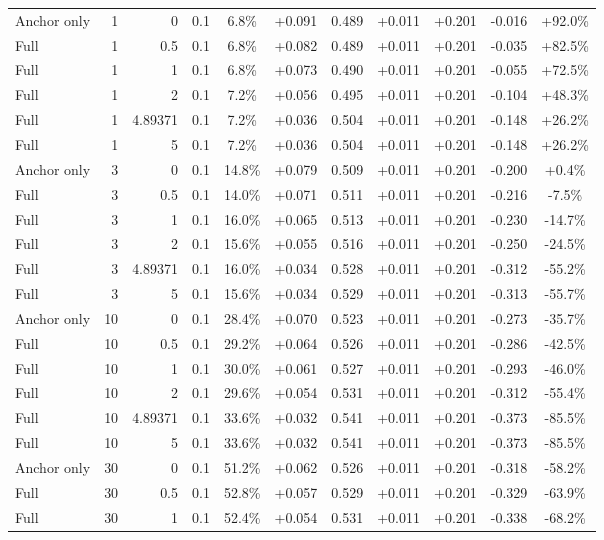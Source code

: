 \begin{table}[htbp]
\begin{tabular}{lrrrccccccc}
Anchor only & 1 & 0 & 0.1 & 6.8\% & +0.091 & 0.489 & +0.011 & +0.201 & -0.016 & +92.0\% \\
Full & 1 & 0.5 & 0.1 & 6.8\% & +0.082 & 0.489 & +0.011 & +0.201 & -0.035 & +82.5\% \\
Full & 1 & 1 & 0.1 & 6.8\% & +0.073 & 0.490 & +0.011 & +0.201 & -0.055 & +72.5\% \\
Full & 1 & 2 & 0.1 & 7.2\% & +0.056 & 0.495 & +0.011 & +0.201 & -0.104 & +48.3\% \\
Full & 1 & 4.89371 & 0.1 & 7.2\% & +0.036 & 0.504 & +0.011 & +0.201 & -0.148 & +26.2\% \\
Full & 1 & 5 & 0.1 & 7.2\% & +0.036 & 0.504 & +0.011 & +0.201 & -0.148 & +26.2\% \\
Anchor only & 3 & 0 & 0.1 & 14.8\% & +0.079 & 0.509 & +0.011 & +0.201 & -0.200 & +0.4\% \\
Full & 3 & 0.5 & 0.1 & 14.0\% & +0.071 & 0.511 & +0.011 & +0.201 & -0.216 & -7.5\% \\
Full & 3 & 1 & 0.1 & 16.0\% & +0.065 & 0.513 & +0.011 & +0.201 & -0.230 & -14.7\% \\
Full & 3 & 2 & 0.1 & 15.6\% & +0.055 & 0.516 & +0.011 & +0.201 & -0.250 & -24.5\% \\
Full & 3 & 4.89371 & 0.1 & 16.0\% & +0.034 & 0.528 & +0.011 & +0.201 & -0.312 & -55.2\% \\
Full & 3 & 5 & 0.1 & 15.6\% & +0.034 & 0.529 & +0.011 & +0.201 & -0.313 & -55.7\% \\
Anchor only & 10 & 0 & 0.1 & 28.4\% & +0.070 & 0.523 & +0.011 & +0.201 & -0.273 & -35.7\% \\
Full & 10 & 0.5 & 0.1 & 29.2\% & +0.064 & 0.526 & +0.011 & +0.201 & -0.286 & -42.5\% \\
Full & 10 & 1 & 0.1 & 30.0\% & +0.061 & 0.527 & +0.011 & +0.201 & -0.293 & -46.0\% \\
Full & 10 & 2 & 0.1 & 29.6\% & +0.054 & 0.531 & +0.011 & +0.201 & -0.312 & -55.4\% \\
Full & 10 & 4.89371 & 0.1 & 33.6\% & +0.032 & 0.541 & +0.011 & +0.201 & -0.373 & -85.5\% \\
Full & 10 & 5 & 0.1 & 33.6\% & +0.032 & 0.541 & +0.011 & +0.201 & -0.373 & -85.5\% \\
Anchor only & 30 & 0 & 0.1 & 51.2\% & +0.062 & 0.526 & +0.011 & +0.201 & -0.318 & -58.2\% \\
Full & 30 & 0.5 & 0.1 & 52.8\% & +0.057 & 0.529 & +0.011 & +0.201 & -0.329 & -63.9\% \\
Full & 30 & 1 & 0.1 & 52.4\% & +0.054 & 0.531 & +0.011 & +0.201 & -0.338 & -68.2\% \\

\end{tabular}
\end{table}
